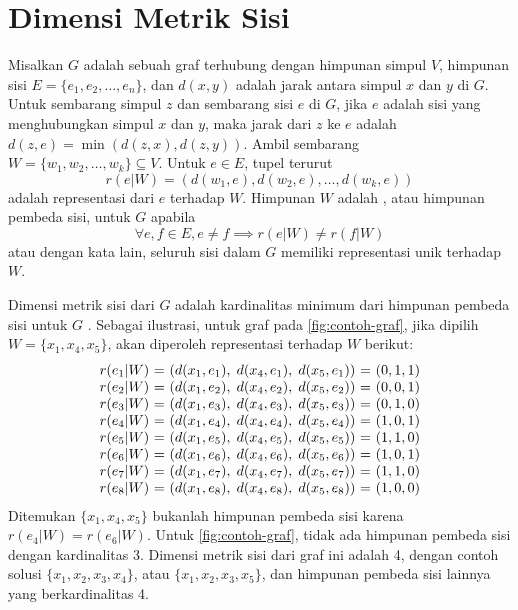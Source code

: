 \section{Dimensi Metrik Sisi}

Misalkan \(G\) adalah sebuah graf terhubung dengan himpunan simpul \(V\), himpunan sisi \(E = \{e_1, e_2, \ldots, e_n\}\), dan \(d(x, y)\) adalah jarak antara simpul \(x\) dan \(y\) di \(G\). Untuk sembarang simpul \(z\) dan sembarang sisi \(e\) di \(G\), jika \(e\) adalah sisi yang menghubungkan simpul \(x\) dan \(y\), maka jarak dari \(z\) ke \(e\) adalah \( d(z, e) = \min(d(z, x), d(z, y)) \). Ambil sembarang \(W = \{w_1, w_2, \ldots, w_k\} \subseteq V\). Untuk \(e \in E\), tupel terurut
	\[ r(e|W) = (d(w_1, e), d(w_2, e), \ldots, d(w_k, e)) \]
adalah representasi dari \(e\) terhadap \(W\). Himpunan \(W\) adalah , atau himpunan pembeda sisi, untuk \(G\) apabila
	\[ \forall e, f \in E, e \neq f \implies r(e|W) \neq r(f|W) \]
atau dengan kata lain, seluruh sisi dalam \(G\) memiliki representasi unik terhadap \(W\).

Dimensi metrik sisi dari \(G\) adalah kardinalitas minimum dari himpunan pembeda sisi untuk \(G\) \citep{kelenc2018}. Sebagai ilustrasi, untuk graf pada \autoref{fig:contoh-graf}, jika dipilih \(W = \{x_1, x_4, x_5\}\), akan diperoleh representasi terhadap \(W\) berikut:
\[
\begin{array}{c@{\ }c@{\ }c@{\ }c@{\ }c}
	r(e_1|W) & = & ( d(x_1, e_1), \; d(x_4, e_1), \; d(x_5, e_1) ) & = & (0, 1, 1) \\
	r(e_2|W) & = & ( d(x_1, e_2), \; d(x_4, e_2), \; d(x_5, e_2) ) & = & (0, 0, 1) \\
	r(e_3|W) & = & ( d(x_1, e_3), \; d(x_4, e_3), \; d(x_5, e_3) ) & = & (0, 1, 0) \\
	r(e_4|W) & = & ( d(x_1, e_4), \; d(x_4, e_4), \; d(x_5, e_4) ) & = & (1, 0, 1) \\
	r(e_5|W) & = & ( d(x_1, e_5), \; d(x_4, e_5), \; d(x_5, e_5) ) & = & (1, 1, 0) \\
	r(e_6|W) & = & ( d(x_1, e_6), \; d(x_4, e_6), \; d(x_5, e_6) ) & = & (1, 0, 1) \\
	r(e_7|W) & = & ( d(x_1, e_7), \; d(x_4, e_7), \; d(x_5, e_7) ) & = & (1, 1, 0) \\
	r(e_8|W) & = & ( d(x_1, e_8), \; d(x_4, e_8), \; d(x_5, e_8) ) & = & (1, 0, 0)
\end{array}
\]
Ditemukan \(\{x_1, x_4, x_5\}\) bukanlah himpunan pembeda sisi karena \(r(e_4|W) = r(e_6|W)\). Untuk \autoref{fig:contoh-graf}, tidak ada himpunan pembeda sisi dengan kardinalitas 3. Dimensi metrik sisi dari graf ini adalah 4, dengan contoh solusi \(\{x_1, x_2, x_3, x_4\}\), atau \(\{x_1, x_2, x_3, x_5\}\), dan himpunan pembeda sisi lainnya yang berkardinalitas 4.

